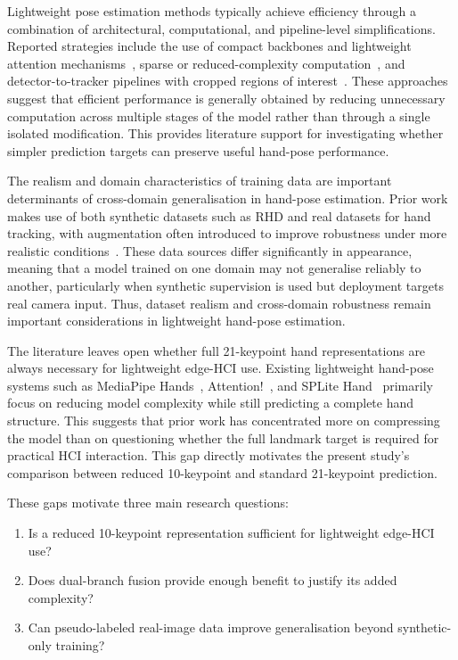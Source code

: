 ﻿\documentclass[10pt,letterpaper]{article}
\begin{document}
\medskip
Lightweight pose estimation methods typically achieve efficiency through a combination of architectural, computational, and pipeline-level simplifications. Reported strategies include the use of compact backbones and lightweight attention mechanisms~\cite{attentionlite}, sparse or reduced-complexity computation~\cite{splitehand}, and detector-to-tracker pipelines with cropped regions of interest~\cite{mediapipe}. These approaches suggest that efficient performance is generally obtained by reducing unnecessary computation across multiple stages of the model rather than through a single isolated modification. This provides literature support for investigating whether simpler prediction targets can preserve useful hand-pose performance.

\medskip
The realism and domain characteristics of training data are important determinants of cross-domain generalisation in hand-pose estimation. Prior work makes use of both synthetic datasets such as RHD and real datasets for hand tracking, with augmentation often introduced to improve robustness under more realistic conditions~\cite{handobjectgcn,lightweightgcnhand,handaugment}. These data sources differ significantly in appearance, meaning that a model trained on one domain may not generalise reliably to another, particularly when synthetic supervision is used but deployment targets real camera input. Thus, dataset realism and cross-domain robustness remain important considerations in lightweight hand-pose estimation.

\medskip
The literature leaves open whether full 21-keypoint hand representations are always necessary for lightweight edge-HCI use. Existing lightweight hand-pose systems such as MediaPipe Hands~\cite{mediapipe}, Attention!~\cite{attentionlite}, and SPLite Hand~\cite{splitehand} primarily focus on reducing model complexity while still predicting a complete hand structure. This suggests that prior work has concentrated more on compressing the model than on questioning whether the full landmark target is required for practical HCI interaction. This gap directly motivates the present study's comparison between reduced 10-keypoint and standard 21-keypoint prediction.

\medskip
These gaps motivate three main research questions:
\begin{enumerate}
    \item Is a reduced 10-keypoint representation sufficient for lightweight edge-HCI use?
    \item Does dual-branch fusion provide enough benefit to justify its added complexity?
    \item Can pseudo-labeled real-image data improve generalisation beyond synthetic-only training?
\end{enumerate}
\end{document}

